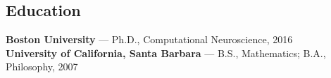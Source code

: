 \documentclass[margin,line]{res}
\begin{document}
\begin{resume}
\section{Education}
\textbf{Boston University} — Ph.D., Computational Neuroscience, 2016\\
\textbf{University of California, Santa Barbara} — B.S., Mathematics; B.A., Philosophy, 2007

\end{resume}
\end{document}
